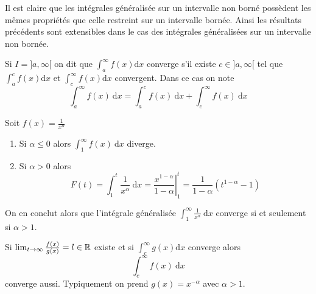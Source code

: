 \begin{remarque}Il est claire que les intégrales généralisée sur un intervalle non borné possèdent les mêmes propriétés que celle restreint sur un intervalle bornée. Ainsi les résultats précédents sont extensibles dans le cas des intégrales généralisées sur un intervalle non bornée.
\end{remarque}

\begin{definition}
	Si $I = ]a, \infty[$ on dit que $\int_a^\infty f(x) \mathrm d x$ converge s'il existe $c \in ]a, \infty[$ tel que $\int_a^c f(x) \mathrm d x$ et $\int_c^\infty f(x) \mathrm d x$ convergent. Dans ce cas on note
	\[
	\int_a^\infty f(x) ~\mathrm d x = \int_a^c f(x) ~\mathrm d x + \int_c^\infty f(x) ~\mathrm d x
	\]
\end{definition}

\begin{exemple}Soit $f(x) = \frac1{x^\alpha}$
\begin{enumerate}
	\item Si $\alpha \leqslant 0$ alors $\int_1^\infty f(x) ~\mathrm d x$ diverge.
	\item Si $\alpha > 0$ alors
	\[
	F(t) = \int_1^t \frac{1}{x^\alpha} ~\mathrm d x = \left. \frac{x^{1- \alpha}}{1 - \alpha} \right|_1^t = \frac{1}{1 - \alpha} ( t^{1 - \alpha} -1)
	\]
\end{enumerate}
	On en conclut alors que l'intégrale généralisée $\int_1^\infty \frac{1}{x^\alpha} ~\mathrm d x$ converge si et seulement si $\alpha > 1$.
\end{exemple}

\begin{proposition}
	Si $\lim_{t \to \infty} \frac{f(x)}{g(x)} = l \in \mathbb{R}$ existe et si $\int_c^\infty g(x) \mathrm d x $ converge alors
	\[
	\int_c^\infty f(x) ~\mathrm d x 
	\]
	converge aussi. Typiquement on prend $g(x) = x^{-\alpha}$ avec $\alpha > 1$.
\end{proposition}


